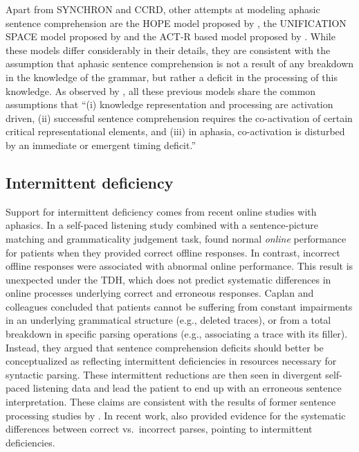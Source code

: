 \documentclass{cambridge7A}\usepackage[]{graphicx}\usepackage[]{color}
\begin{document}
Apart from SYNCHRON and CCRD, other attempts at modeling aphasic sentence comprehension are the HOPE model proposed by \cite{Gigley-1986}, the UNIFICATION SPACE model proposed by \cite{Kempen-Vosse-1989,vossekempen2000} and the ACT-R based model proposed by \cite{Crescentini-Stocco-2005}. While these models differ considerably in their details, they are consistent with the assumption that aphasic sentence comprehension is not a result of any breakdown in the knowledge of the grammar, but rather a deficit in the processing of this knowledge. As observed by \cite[p.~82][]{Haarmann-EtAl-1997}, 
all these previous models share the common assumptions that ``(i) knowledge representation and processing are activation driven, (ii) successful sentence comprehension requires the co-activation of certain critical representational elements, and (iii) in aphasia, co-activation is disturbed by an immediate or emergent timing deficit.'' 

\subsection{Intermittent deficiency}
Support for intermittent deficiency comes from recent online studies with aphasics. In a self-paced listening study combined with a sentence-picture matching and grammaticality judgement task, \cite{Caplan:2007} found normal \textit{online} performance for patients when they provided correct offline responses. In contrast, incorrect offline responses were associated with abnormal online performance. This result is unexpected under the TDH, which does not predict systematic differences in online processes underlying correct and erroneous responses. Caplan and colleagues concluded that patients cannot be suffering from constant impairments in an underlying grammatical structure (e.g., deleted traces), or from a total breakdown in specific parsing operations (e.g., associating a trace with its filler). Instead, they argued that sentence comprehension deficits should better be conceptualized as reflecting intermittent deficiencies in resources necessary for syntactic parsing. These intermittent reductions are then seen in divergent self-paced listening data and lead the patient to end up with an erroneous sentence interpretation. These claims are consistent with the results of former sentence processing studies by \cite{Caplan:2003,Caplan:1995}.
In recent work, \cite{hanneetal11} also provided evidence for the systematic differences between correct vs.\ incorrect parses, pointing to intermittent deficiencies.
\end{document}
